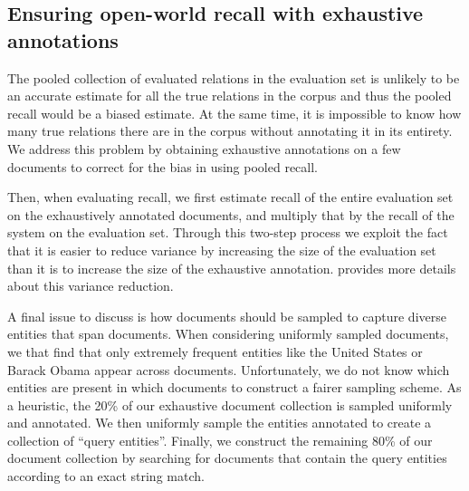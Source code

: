 \subsection{Ensuring open-world recall with exhaustive annotations}
The pooled collection of evaluated relations in the evaluation set is unlikely to be an accurate estimate for all the true relations in the corpus and thus the pooled recall would be a biased estimate.
At the same time, it is impossible to know how many true relations there are in the corpus without annotating it in its entirety.
We address this problem by obtaining exhaustive annotations on a few documents to correct for the bias in using pooled recall.


Then, when evaluating recall, we first estimate recall of the entire evaluation set on the exhaustively annotated documents, and multiply that by the recall of the system on the evaluation set. Through this two-step process we exploit the fact that it is easier to reduce variance by increasing the size of the evaluation set than it is to increase the size of the exhaustive annotation.  provides more details about this variance reduction.

A final issue to discuss is how documents should be sampled to capture diverse entities that span documents. %
When considering uniformly sampled documents, we that find that only extremely frequent entities like the United States or Barack Obama appear across documents.
Unfortunately, we do not know which entities are present in which documents to construct a fairer sampling scheme.
As a heuristic, the 20\% of our exhaustive document collection is sampled uniformly and annotated.
We then uniformly sample the entities annotated to create a collection of ``query entities''.
Finally, we construct the remaining 80\% of our document collection by searching for documents that contain the query entities according to an exact string match.

